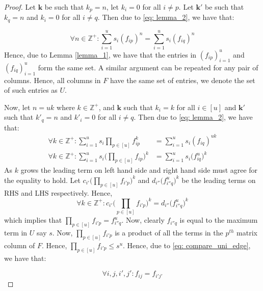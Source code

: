   \begin{proof}
  Let $\bm{k}$ be such that $k_p=n$, let $k_i = 0$ for all $i \neq p$. Let $\bm{k'}$ be such  that $k_q=n$ and $k_i = 0$ for all $i \neq q$. Then due to \eqref{eq: lemma_2}, we have that:
  
  \begin{equation}
  \forall n \in \mathbb{Z^{+}}: \sum_{i=1}^{u}s_i(f_{ip})^{n} = \sum_{i=1}^{u}s_i(f_{iq})^{n}
  \end{equation} 
  Hence, due to Lemma \ref{lemma_1}, we have that the entries in $(f_{ip})^{u}_{i=1}$ and $(f_{iq})^{u}_{i=1}$ form the same set. A similar argument can 
  be repeated for any pair of columns. Hence, all columns in $F$ have the same set of entries, we denote the set of such entries as $U$. 
  
  Now, let $n = uk$ where $k \in \mathbb{Z}^{+}$, and $\bm{k}$ such that $k_i=k$ for all $i \in [u]$ and $\bm{k'}$ such that $k'_q=n$ and $k'_i = 0$ for all $i \neq q$. Then due to \eqref{eq: lemma_2}, we have that:
  \begin{align*}
    \forall k \in \mathbb{Z^{+}}: \sum_{i=1}^{u} s_i \prod_{p\in[u]}f_{ip}^{k} &= \sum_{i=1}^{u}s_i(f_{iq})^{uk}\\
    \forall k \in \mathbb{Z^{+}}: \sum_{i=1}^{u} s_i \bigl(\prod_{p\in[u]}f_{ip}\bigr)^{k} &= \sum_{i=1}^{u}s_i (f_{iq}^{u}\bigr)^{k}
  \end{align*} 
  As $k$ grows the leading term on left hand side and right hand side must agree for the equality to hold. Let $c_{i'} \bigl(\prod_{p\in[u]}f_{i'p}\bigr)^{k}$ and $d_{i''} (f_{i''q}^{u}\bigr)^{k}$ be the leading terms on RHS and LHS respectively.
  Hence,
  \begin{equation}
    \label{eq: compare_uni_edge}
    \forall k \in \mathbb{Z^{+}} : c_{i'} \bigl(\prod_{p\in[u]}f_{i'p}\bigr)^{k} = d_{i''} (f_{i''q}^{u}\bigr)^{k} 
  \end{equation}
  which implies that $\prod_{p\in[u]}f_{i'p} = f_{i''q}^{u}$. Now, clearly $f_{i''q}$ is equal to the maximum term in $U$ say $s$. Now, $\prod_{p\in[u]}f_{i'p}$ is a product of all  the terms in 
  the $p^{th}$ matrix column of $F$. Hence, $\prod_{p\in[u]}f_{i'p} \leq s^{u}$. Hence, due to \eqref{eq: compare_uni_edge}, we have that:
  
  \begin{equation*}
    \forall i,j,i',j' : f_{ij} = f_{i'j'}
  \end{equation*} 
  \end{proof}
  
  
  
 
